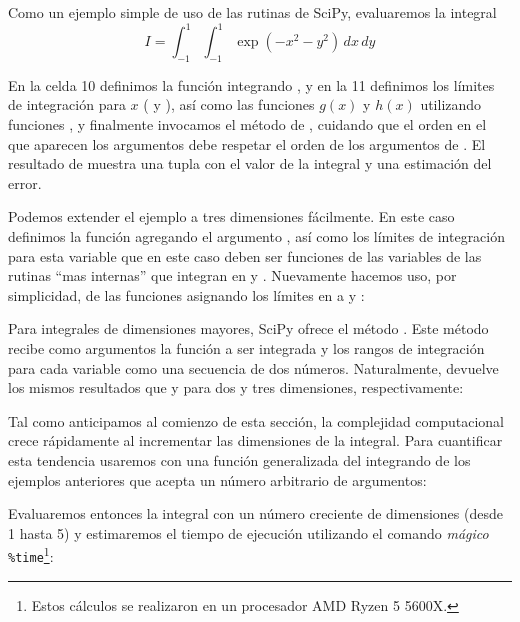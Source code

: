 Como un ejemplo simple de uso de las rutinas de SciPy, evaluaremos la integral
\begin{equation}\label{eq:intmcmul02}
 I = \int_{-1}^{1} \int_{-1}^1 \exp\left( -x^2 - y^2 \right) \, dx \, dy 
\end{equation}

En la celda 10 definimos la función integrando , y en la 11 definimos los límites de integración para $x$ ( y ), así como las funciones $g(x)$ y $h(x)$ utilizando funciones , y finalmente invocamos el método  de , cuidando que el orden en el que aparecen los argumentos debe respetar el orden de los argumentos de . El resultado de  muestra una tupla con el valor de la integral y una estimación del error.

Podemos extender el ejemplo a tres dimensiones fácilmente. En este caso definimos la función  agregando el argumento , así como los límites de integración para esta variable que en este caso deben ser funciones de las variables de las rutinas ``mas internas'' que integran en  y . Nuevamente hacemos uso, por simplicidad, de las funciones  asignando los límites en  a  y :

Para integrales de dimensiones mayores, SciPy ofrece el método . Este método recibe como argumentos la función a ser integrada y los rangos de integración para cada variable como una secuencia de dos números. Naturalmente,  devuelve los mismos resultados que  y  para dos y tres dimensiones, respectivamente:

Tal como anticipamos al comienzo de esta sección, la complejidad computacional crece rápidamente al incrementar las dimensiones de la integral. Para cuantificar esta tendencia usaremos  con una función generalizada del integrando de los ejemplos anteriores que acepta un número arbitrario de argumentos:

Evaluaremos entonces la integral con un número creciente de dimensiones (desde 1 hasta 5) y estimaremos el tiempo de ejecución utilizando el comando \textit{mágico} \verb|%time|\footnote{Estos cálculos se realizaron en un procesador AMD Ryzen 5 5600X.}:

